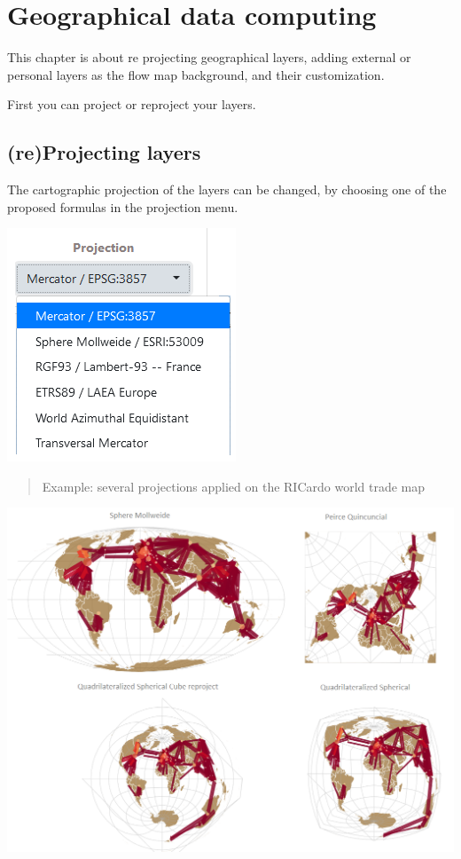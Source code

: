 \documentclass[
  letterpaper,
  DIV=11,
  numbers=noendperiod]{scrreprt}
\begin{document}
\chapter{Geographical data computing}\label{geographical-data-computing}

This chapter is about re projecting geographical layers, adding external
or personal layers as the flow map background, and their customization.

First you can project or reproject your layers.

\section{(re)Projecting layers}\label{reprojecting-layers}

The cartographic projection of the layers can be changed, by choosing
one of the proposed formulas in the projection menu.

\begin{center}
\includegraphics{images/Geo_projection.png}
\end{center}

\begin{quote}
Example: several projections applied on the RICardo world trade map
\end{quote}

\includegraphics{images/RIcardo_reprojection.png}
\end{document}
